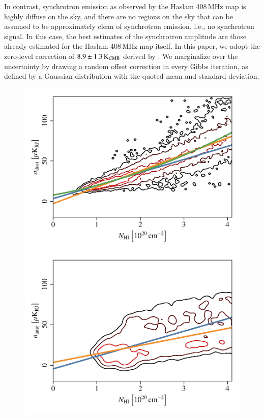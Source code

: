 \documentclass[twocolumn]{aa}
\begin{document}
In contrast, synchrotron emission as observed by the Haslam 408\,MHz
map is highly diffuse on the sky, and there are no regions on the sky
that can be assumed to be approximately clean of synchrotron emission,
i.e., no synchrotron signal.
In this case, the best estimates of the synchrotron amplitude are those
already estimated for the Haslam 408\,MHz map itself. In this paper,
we adopt the zero-level correction of $8.9\pm 1.3\KCMB$ derived by
\citet{wehus2014}. We marginalize over the uncertainty by drawing a
random offset correction in every Gibbs iteration, as defined by
a Gaussian distribution with the quoted mean and standard deviation.


\begin{figure}
  \center	
  \includegraphics[width=\linewidth]{figs/nhi_dust_plot3_smooth_n0064_60arcmin.pdf}\\
  \includegraphics[width=\linewidth]{figs/nhi_ame_plot3_smooth_n0016_600arcmin.pdf}

\end{figure}
\end{document}
